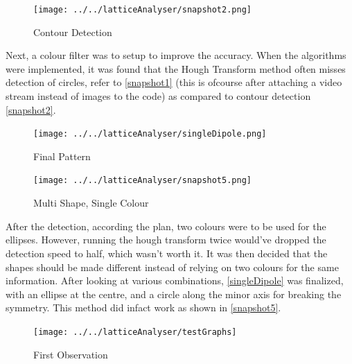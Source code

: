 			\begin{figure}[bth]
				\begin{center}
					\texttt{[image: ../../latticeAnalyser/snapshot2.png]}
				\end{center}
			\caption[Contour Detection]{Contour Detection}
			\label{snapshot2}
			\end{figure}

			Next, a colour filter was to setup to improve the accuracy. When the algorithms were implemented, it was found that the Hough Transform method often misses detection of circles, refer to \autoref{snapshot1} (this is ofcourse after attaching a video stream instead of images to the code) as compared to contour detection \autoref{snapshot2}.
			\par

			\begin{figure}[bth]
				\begin{center}
					\texttt{[image: ../../latticeAnalyser/singleDipole.png]}
				\end{center}
			\caption[Final Pattern]{Final Pattern}
			\label{singleDipole}
			\end{figure}

			\begin{figure}[bth]
				\begin{center}
					\texttt{[image: ../../latticeAnalyser/snapshot5.png]}
				\end{center}
			\caption[Multi Shape, Single Colour]{Multi Shape, Single Colour}
			\label{snapshot5}
			\end{figure}

			After the detection, according the plan, two colours were to be used for the ellipses. However, running the hough transform twice would've dropped the detection speed to half, which wasn't worth it. It was then decided that the shapes should be made different instead of relying on two colours for the same information. After looking at various combinations, \autoref{singleDipole} was finalized, with an ellipse at the centre, and a circle along the minor axis for breaking the symmetry. This method did infact work as shown in \autoref{snapshot5}.
			\par

			\begin{figure}[bth]
				\begin{center}
					\texttt{[image: ../../latticeAnalyser/testGraphs]}
				\end{center}
			\caption[First Observation]{First Observation}
			\label{testGraphs}
			\end{figure}

